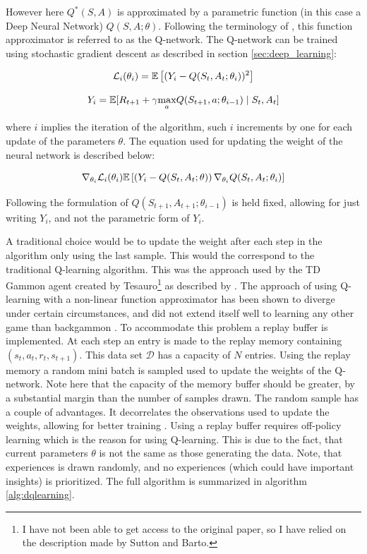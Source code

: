 However here $Q^*(S, A)$ is approximated by a parametric function (in this case a Deep Neural Network) $Q(S, A ; \theta)$. Following the terminology of \textcite{mnih_playing_2013}, this function approximator is referred to as the Q-network. The Q-network can be trained using stochastic gradient descent as described in section \ref{sec:deep_learning}:

\begin{equation}
    \mathcal{L}_i(\theta_i) = \mathbb{E} \left[ (Y_i - Q(S_t, A_t ; \theta_i))^2 \right]
\end{equation}

\begin{equation}
    Y_i = \mathbb{E} [R_{t+1} + \gamma \underset{a}\max Q(S_{t+1}, a; \theta_{i-1}) \mid S_t, A_t ]
\end{equation}

where $i$ implies the iteration of the algorithm, such $i$ increments by one for each update of the parameters $\theta$. The equation used for updating the weight of the neural network is described below:

\begin{equation}
    \nabla_{\theta_i} \mathcal{L}_i (\theta_i)  \mathbb{E} \left[ \left( Y_i - Q(S_t, A_t ; \theta) \right) \nabla_{\theta_i} Q(S_t, A_t; \theta_i) \right]
\end{equation}

Following the formulation of \textcite{mnih_playing_2013} $Q(S_{t+1}, A_{t+1}; \theta_{i-1})$ is held fixed, allowing for just writing $Y_i$, and not the parametric form of $Y_i$.

A traditional choice would be to update the weight after each step in the algorithm only using the last sample. This would the correspond to the traditional Q-learning algorithm. This was the approach used by the TD Gammon agent created by Tesauro\footnote{I have not been able to get access to the original paper, so I have relied on the description made by Sutton and Barto.} as described by \textcite{sutton_reinforcement_2018}. The approach of using Q-learning with a non-linear function approximator has been shown to diverge under certain circumstances, and did not extend itself well to learning any other game than backgammon \parencite{tsitsiklis_analysis_1997}. To accommodate this problem a replay buffer is implemented. At each step an entry is made to the replay memory containing $(s_t, a_t, r_t, s_{t+1})$. This data set $\mathcal{D}$ has a capacity of $N$ entries. Using the replay memory a random mini batch is sampled used to update the weights of the Q-network. Note here that the capacity of the memory buffer should be greater, by a substantial margin than the number of samples drawn. The random sample has a couple of advantages. It decorrelates the observations used to update the weights, allowing for better training \textcite{mnih_playing_2013}. Using a replay buffer requires off-policy learning which is the reason for using Q-learning. This is due to the fact, that current parameters $\theta$ is not the same as those generating the data. Note, that experiences is drawn randomly, and no experiences (which could have important insights) is prioritized. The full algorithm is summarized in algorithm \ref{alg:dqlearning}.

